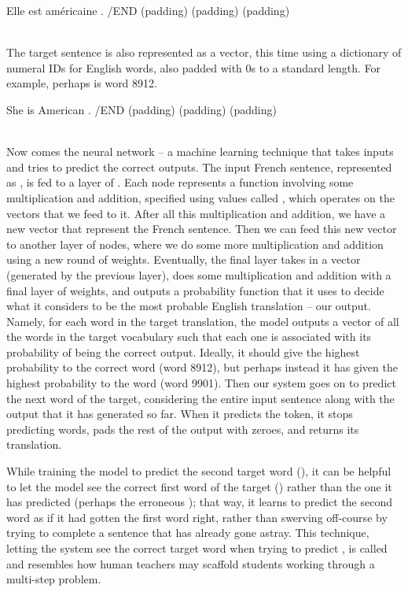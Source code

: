 \ea \label{encoder} \gll Elle est am\'ericaine . /END (padding) (padding) (padding) \\
     [2483, 2891, 1322,  4, 2, 0, 0, 0] \\
        \glt{}
        \z 


The target sentence is also represented as a vector, this time using a dictionary of numeral IDs for English words, also padded with 0s to a standard length.  For example, perhaps  is word 8912.

\ea \label{decoder} \gll She is American . /END (padding) (padding) (padding) \\
     [8912, 6585, 1901,  4, 2, 0, 0, 0] \\
        \glt{}
\z 

Now comes the neural network -- a machine learning technique that takes inputs and tries to predict the correct outputs.  The input French sentence, represented as , is fed to a layer of .  Each node represents a function involving some multiplication and addition, specified using values called , which operates on the vectors that we feed to it.  After all this multiplication and addition, we have a new vector that represent the French sentence.  Then we can feed this new vector to another layer of nodes, where we do some more multiplication and addition using a new round of weights.  Eventually, the final layer takes in a vector (generated by the previous layer), does some multiplication and addition with a final layer of weights, and outputs a probability function that it uses to decide what it considers to be the most probable English translation -- our output.  Namely, for each word in the target translation, the model outputs a vector of all the words in the target vocabulary such that each one is associated with its probability of being the correct output. Ideally, it should give the highest probability to the correct word  (word 8912), but perhaps instead it has given the highest probability to the word  (word 9901).
Then our system goes on to predict the next word of the target, considering the entire input sentence along with the output that it has generated so far.  When it predicts the  token, it stops predicting words, pads the rest of the output with zeroes, and returns its translation.

While training the model to predict the second target word (), it can be helpful to let the model see the correct first word of the target () rather than the one it has predicted (perhaps the erroneous ); that way, it learns to predict the second word as if it had gotten the first word right, rather than swerving off-course by trying to complete a sentence that has already gone astray.   This technique, letting the system see the correct target word  when trying to predict , is called  and resembles how human teachers may scaffold students working through a multi-step problem.


